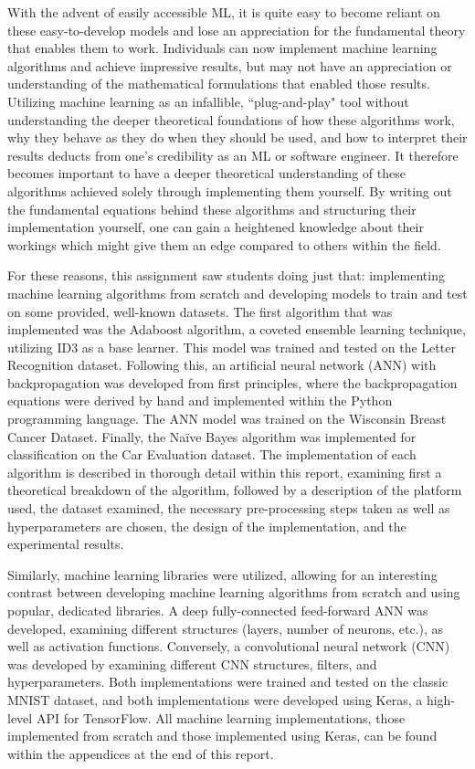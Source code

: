 \documentclass[a4paper]{article}
\begin{document}
With the advent of easily accessible ML, it is quite easy to become reliant on these easy-to-develop models and lose an appreciation for the fundamental theory that enables them to work. Individuals can now implement machine learning algorithms and achieve impressive results, but may not have an appreciation or understanding of the mathematical formulations that enabled those results. Utilizing machine learning as an infallible, ``plug-and-play" tool without understanding the deeper theoretical foundations of how these algorithms work, why they behave as they do when they should be used, and how to interpret their results deducts from one's credibility as an ML or software engineer. It therefore becomes important to have a deeper theoretical understanding of these algorithms achieved solely through implementing them yourself. By writing out the fundamental equations behind these algorithms and structuring their implementation yourself, one can gain a heightened knowledge about their workings which might give them an edge compared to others within the field. 

For these reasons, this assignment saw students doing just that: implementing machine learning algorithms from scratch and developing models to train and test on some provided, well-known datasets. The first algorithm that was implemented was the Adaboost algorithm, a coveted ensemble learning technique, utilizing ID3 as a base learner. This model was trained and tested on the Letter Recognition dataset. Following this, an artificial neural network (ANN) with backpropagation was developed from first principles, where the backpropagation equations were derived by hand and implemented within the Python programming language. The ANN model was trained on the Wisconsin Breast Cancer Dataset. Finally, the Naïve Bayes algorithm was implemented for classification on the Car Evaluation dataset. The implementation of each algorithm is described in thorough detail within this report, examining first a theoretical breakdown of the algorithm, followed by a description of the platform used, the dataset examined, the necessary pre-processing steps taken as well as hyperparameters are chosen, the design of the implementation, and the experimental results.

Similarly, machine learning libraries were utilized, allowing for an interesting contrast between developing machine learning algorithms from scratch and using popular, dedicated libraries. A deep fully-connected feed-forward ANN was developed, examining different structures (layers, number of neurons, etc.), as well as activation functions. Conversely, a convolutional neural network (CNN) was developed by examining different CNN structures, filters, and hyperparameters. Both implementations were trained and tested on the classic MNIST dataset, and both implementations were developed using Keras, a high-level API for TensorFlow. All machine learning implementations, those implemented from scratch and those implemented using Keras, can be found within the appendices at the end of this report. 
\end{document}
